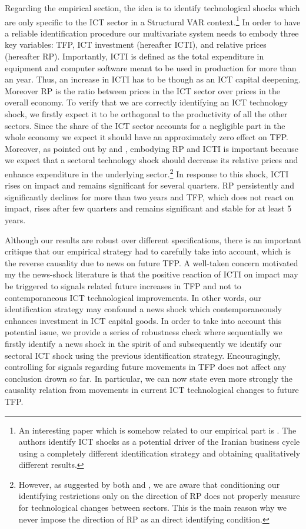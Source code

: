 \documentclass[14pt]{article}
\begin{document}
Regarding the empirical section, the idea is to identify technological shocks which are only specific to the ICT sector in a Structural VAR context.\footnote{An interesting paper which is somehow related to our empirical part is \cite{jafari2012impact}. The authors identify ICT shocks as a potential driver of the Iranian business cycle using a completely different identification strategy and obtaining qualitatively different results.} In order to have a reliable identification procedure our multivariate system needs to embody three key variables: TFP, ICT investment (hereafter ICTI), and relative prices (hereafter RP). Importantly, ICTI is defined as the total expenditure in equipment and computer software meant to be used in production for more than an year. Thus, an increase in ICTI has to be though as an ICT capital deepening. Moreover RP is the ratio between prices in the ICT sector over prices in the overall economy. To verify that we are correctly identifying an ICT technology shock, we firstly expect it to be orthogonal to the productivity of all the other sectors. Since the share of the ICT sector accounts for a negligible part in the whole economy we expect it should have an approximately zero effect on TFP. Moreover, as pointed out by \cite{greenwood1997long} and \cite{fisher2006dynamic}, embodying RP and ICTI is important because we expect that a sectoral technology shock should decrease its relative prices and enhance expenditure in the underlying sector.\footnote{However, as suggested by both \cite{greenwood2000role} and \cite{basu2010sector}, we are aware that conditioning our identifying restrictions only on the direction of RP does not properly measure for technological changes between sectors. This is the main reason why we never impose the direction of RP as an direct identifying condition.} In response to this shock, ICTI rises on impact and remains significant for several quarters. RP persistently and significantly declines for more than two years and TFP, which does not react on impact, rises after few quarters and remains significant and stable for at least 5 years. 

Although our results are robust over different specifications, there is an important critique that our empirical strategy had to carefully take into account, which is the reverse causality due to news on future TFP. A well-taken concern motivated my the news-shock literature is that the positive reaction of ICTI on impact may be triggered to signals related future increases in TFP and not to contemporaneous ICT technological improvements. In other words, our identification strategy may confound a news shock which contemporaneously enhances investment in ICT capital goods. In order to take into account this potential issue, we provide a series of robustness check where sequentially we firstly identify a news shock in the spirit of \cite{barsky2011news} and subsequently we identify our sectoral ICT shock using the previous identification strategy. Encouragingly, controlling for signals regarding future movements in TFP does not affect any conclusion drown so far. In particular, we can now state even more strongly the causality relation from movements in current ICT technological changes to future TFP. 
\end{document}
